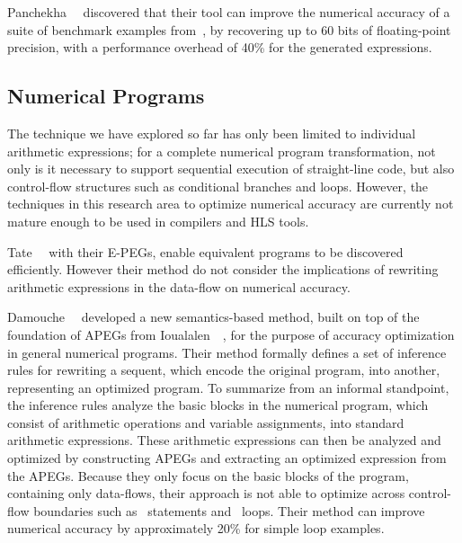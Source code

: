 Panchekha~\etal~\cite{panchekha15} discovered that their tool can improve the
numerical accuracy of a suite of benchmark examples from~\cite{hamming86},
by recovering up to 60 bits of floating-point precision, with a performance
overhead of 40\% for the generated expressions.


\subsection{Numerical Programs}
\label{bg:sub:numerical_programs}

The technique we have explored so far has only been limited to individual
arithmetic expressions; for a complete numerical program transformation, not
only is it necessary to support sequential execution of straight-line code,
but also control-flow structures such as conditional branches and loops.
However, the techniques in this research area to optimize numerical accuracy
are currently not mature enough to be used in compilers and HLS tools.

Tate~\etal~\cite{tate09} with their E-PEGs, enable equivalent programs to be
discovered efficiently.  However their method do not consider the implications
of rewriting arithmetic expressions in the data-flow on numerical accuracy.

Damouche~\etal~\cite{damouche15} developed a new semantics-based method, built
on top of the foundation of APEGs from Ioualalen~\etal~\cite{ioualalen}, for
the purpose of accuracy optimization in general numerical programs.  Their
method formally defines a set of inference rules for rewriting a sequent,
which encode the original program, into another, representing an optimized
program.  To summarize from an informal standpoint, the inference rules
analyze the basic blocks in the numerical program, which consist of arithmetic
operations and variable assignments, into standard arithmetic expressions.
These arithmetic expressions can then be analyzed and optimized by constructing
APEGs and extracting an optimized expression from the APEGs.  Because they
only focus on the basic blocks of the program, containing only data-flows,
their approach is not able to optimize across control-flow boundaries such as
\iflit~statements and \whilelit~loops.  Their method can improve numerical
accuracy by approximately 20\% for simple loop examples.


